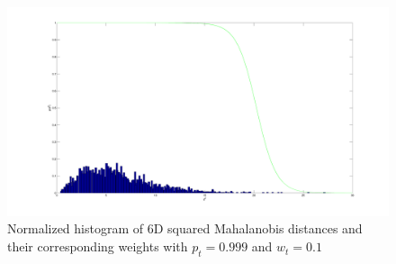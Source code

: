 \documentclass[12pt]{article}
\begin{document}
      \begin{figure}[t]
        \centering
        \includegraphics[scale = 0.3]{bz6d}
        \caption{Normalized histogram of 6D squared Mahalanobis distances and
          their corresponding weights with $p_t=0.999$ and $w_t=0.1$}
        \label{fig:bz6d}
      \end{figure}
\end{document}
